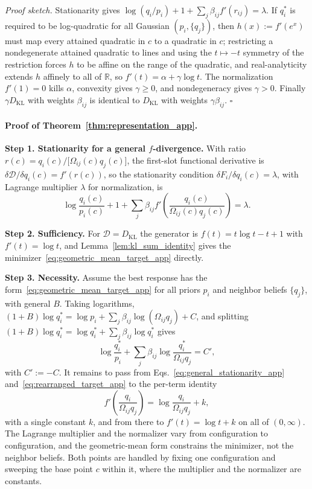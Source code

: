 \emph{Proof sketch.} Stationarity gives $\log(q_i/p_i) + 1 + \sum_j \beta_{ij} f'(r_{ij}) = \lambda$. If $q_i^*$ is required to be log-quadratic for all Gaussian $(p_i, \{q_j\})$, then $h(x) := f'(e^x)$ must map every attained quadratic in $c$ to a quadratic in $c$; restricting a nondegenerate attained quadratic to lines and using the $t \mapsto -t$ symmetry of the restriction forces $h$ to be affine on the range of the quadratic, and real-analyticity extends $h$ affinely to all of $\mathbb{R}$, so $f'(t) = \alpha + \gamma\log t$. The normalization $f'(1) = 0$ kills $\alpha$, convexity gives $\gamma \ge 0$, and nondegeneracy gives $\gamma > 0$. Finally $\gamma D_{\mathrm{KL}}$ with weights $\beta_{ij}$ is identical to $D_{\mathrm{KL}}$ with weights $\gamma\beta_{ij}$. \hfill $\square$

\paragraph{Proof of Theorem~\ref{thm:representation_app}.}

\textbf{Step 1. Stationarity for a general $f$-divergence.} With ratio $r(c)=q_i(c)/\bigl[\Omega_{ij}(c)q_j(c)\bigr]$, the first-slot functional derivative is $\delta\mathcal{D}/\delta q_i(c) = f'(r(c))$, so the stationarity condition $\delta F_i/\delta q_i(c)=\lambda$, with Lagrange multiplier $\lambda$ for normalization, is
\begin{equation}
\log\frac{q_i(c)}{p_i(c)} + 1
+ \sum_j \beta_{ij}f'\left(\frac{q_i(c)}{\Omega_{ij}(c)q_j(c)}\right) = \lambda.
\label{eq:general_stationarity_app}
\end{equation}

\textbf{Step 2. Sufficiency.} For $\mathcal{D}=D_{\mathrm{KL}}$ the generator is $f(t)=t\log t - t + 1$ with $f'(t)=\log t$, and Lemma~\ref{lem:kl_sum_identity} gives the minimizer~\eqref{eq:geometric_mean_target_app} directly.

\textbf{Step 3. Necessity.} Assume the best response has the form~\eqref{eq:geometric_mean_target_app} for all priors $p_i$ and neighbor beliefs $\{q_j\}$, with general $B$. Taking logarithms, $(1+B)\log q_i^* = \log p_i + \sum_j\beta_{ij}\log(\Omega_{ij}q_j) + C$, and splitting $(1+B)\log q_i^* = \log q_i^* + \sum_j\beta_{ij}\log q_i^*$ gives
\begin{equation}
\log\frac{q_i^*}{p_i} + \sum_j\beta_{ij}\log\frac{q_i^*}{\Omega_{ij}q_j} = C',
\label{eq:rearranged_target_app}
\end{equation}
with $C' := -C$. It remains to pass from Eqs.~\eqref{eq:general_stationarity_app} and~\eqref{eq:rearranged_target_app} to the per-term identity
\begin{equation}
f'\left(\frac{q_i}{\Omega_{ij}q_j}\right) = \log\frac{q_i}{\Omega_{ij}q_j} + k,
\label{eq:ode_app}
\end{equation}
with a single constant $k$, and from there to $f'(t) = \log t + k$ on all of $(0, \infty)$. The Lagrange multiplier and the normalizer vary from configuration to configuration, and the geometric-mean form constrains the minimizer, not the neighbor beliefs. Both points are handled by fixing one configuration and sweeping the base point $c$ within it, where the multiplier and the normalizer are constants.

